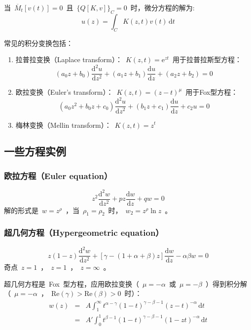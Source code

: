 \documentclass[12pt,a4paper]{article}
\newcommand\dif{\mathrm{d}}
\newcommand\diff{\,\mathrm{d}}
\renewcommand{\[}{\ $\displaystyle}
\renewcommand{\]}{$\ }%
\newcommand{\fdif}[2]{\ensuremath{\frac{\dif #1}{\dif #2}}}
\newcommand{\fdifsq}[2]{\ensuremath{\frac{\dif^2 #1}{\dif #2^2}}}
\newcommand\e{\mathrm{e}}
\begin{document}
	 当\[\overline M_t[v(t)] = 0\]且\[\{Q[K,v]\}_C = 0\]时，微分方程的解为:
	 $$
	   u(z) = \int _C K(z,t)v(t)\diff t
	 $$
	 
	 常见的积分变换包括：
	 \begin{enumerate}
	  \item 拉普拉变换（Laplace transform）：\[K(z,t) = \e^{zt}\]用于拉普拉斯型方程：
	  $$
	   (a_0 z + b_0)\fdifsq{u}{z} + (a_1 z +b_1)\fdif{u}{z} + (a_2 z +b_2) = 0
	  $$
	  \item 欧拉变换（Euler's transform）：\[K(z,t) = (z-t)^\mu\]用于Fox型方程：
	  $$
	   (a_0 z^2 + b_0 z + c_0)\fdifsq{u}{z} + (b_1 z +c_1)\fdif{u}{z} + c_2u=0
	  $$
	  \item 梅林变换（Mellin transform）：\[K(z,t) = z^t\]
	 \end{enumerate}
  \subsection{一些方程实例}
    \subsubsection{欧拉方程（Euler equation）}
	 $$
	   z^2\fdifsq{w}{z} + pz\fdif{w}{z} + qw = 0
	 $$
	 解的形式是\[w = z^\rho\]，当\[\rho_1 = \rho_2\]时，\[w_2 = z^\rho \ln z\]。
	 \subsubsection{超几何方程（Hypergeometric equation）}
	 	$$
	 	  z(1-z)\fdifsq{w}{z} + [\gamma - (1+ \alpha + \beta)z]\fdif{w}{z} -\alpha\beta w = 0
	 	$$
	 	奇点\[z=1\]，\[z=1\]，\[z=\infty\]。
	 	
	 	超几何方程是~Fox~型方程，应用欧拉变换（\[\mu =-\alpha\]或\[\mu = -\beta\]）得到积分解（\[\mu = -\alpha\]，\[\mathrm{Re}(\gamma)>\mathrm{Re}(\beta)>0\]时）：
	 	\begin{eqnarray*}
	 	 w(z) &=& A\int_1^\infty t^{\alpha - \gamma}(1-t)^{\gamma - \beta - 1}(z-t)^{-\alpha}\diff t\\
	 	 &=&A'\int_0^1 t^{\beta -1}(1-t)^{\gamma - \beta -1}(1-zt)^{-\alpha}\diff t
	 	\end{eqnarray*}
\end{document}

